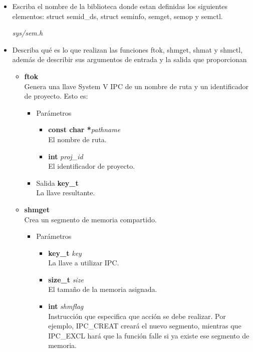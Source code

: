 \begin{itemize}
    \item Escriba el nombre de la biblioteca donde estan definidas los siguientes elementos: struct semid\_ds, struct seminfo, semget, semop y semctl.
    \begin{tcolorbox}
        \textit{sys/sem.h}
    \end{tcolorbox} 
    \item Describa qué es lo que realizan las funciones ftok, shmget, shmat y shmctl, además de describir sus argumentos de entrada y la salida que proporcionan
    \begin{tcolorbox}
	\begin{itemize}
		\item \textbf{ftok}\\
		Genera una llave System V IPC de un nombre de ruta y un identificador de proyecto. Esto es:
		\begin{itemize}
			\item Parámetros
			\begin{itemize}
				\item \textbf{const char *}\textit{pathname}\\
			El nombre de ruta.
				\item \textbf{int} \textit{proj\_id}\\
			El identificador de proyecto.
			\end{itemize}
			\item Salida \textbf{key\_t}\\
			La llave resultante.
		\end{itemize}
		\item \textbf{shmget}\\
		Crea un segmento de memoria compartido.
		\begin{itemize}
			\item Parámetros
			\begin{itemize}
				\item \textbf{key\_t }\textit{key}\\
			La llave a utilizar IPC.
				\item \textbf{size\_t } \textit{size}\\
			El tamaño de la memoria asignada.
				\item \textbf{int} \textit{shmflag}\\
			Instrucción que especifica que acción se debe realizar. Por ejemplo, IPC\_CREAT creará el nuevo segmento, mientras que IPC\_EXCL hará que la función falle si ya existe ese segmento de memoria.

\end{itemize}
\end{itemize}
\end{itemize}
\end{tcolorbox}
\end{itemize}
